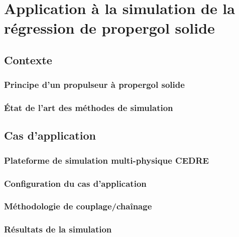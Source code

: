 \chapter{Application à la simulation de la régression de propergol solide}

\section{Contexte}

\subsection{Principe d'un propulseur à propergol solide}

\subsection{État de l'art des méthodes de simulation }


\section{Cas d'application}

\subsection{Plateforme de simulation multi-physique CEDRE}

\subsection{Configuration du cas d'application}

\subsection{Méthodologie de couplage/chaînage}

\subsection{Résultats de la simulation}
